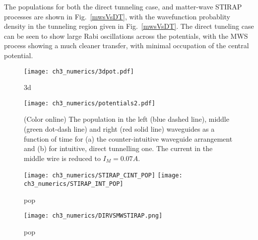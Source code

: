 The populations for both the direct tunneling case, and matter-wave STIRAP processes are shown in Fig.~\ref{mwsVsDT}, with the wavefunction probablity density in the tunneling region given in Fig.~\ref{mwsVsDT}. The direct tuneling case can be seen to show large Rabi oscillations across the potentials, with the MWS process showing a much cleaner transfer, with minimal occupation of the central potential.

\begin{figure}[tb]
    \centering
  \texttt{[image: ch3\_numerics/3dpot.pdf]}
  \caption{3d}
  \label{fig:Populations}
\end{figure}

\begin{figure}[tb]
    \centering
  \texttt{[image: ch3\_numerics/potentials2.pdf]}
  \caption{(Color online) The population in the left (blue dashed line), middle (green dot-dash line) and right (red solid line) waveguides as a function of time for (a) the counter-intuitive waveguide arrangement and (b) for intuitive, direct tunnelling one. The current in the middle wire is reduced to $I_M=0.07 A$.}
  \label{fig:Populations}
\end{figure}

\begin{figure}[tb]
    \centering
  \texttt{[image: ch3\_numerics/STIRAP\_CINT\_POP]}
  \texttt{[image: ch3\_numerics/STIRAP\_INT\_POP]}
  \caption{pop}
  \label{fig:Populations}
\end{figure}

\begin{figure}[tb]
    \centering
  \texttt{[image: ch3\_numerics/DIRVSMWSTIRAP.png]}
  \caption{pop}
  \label{fig:Populations}
\end{figure}

